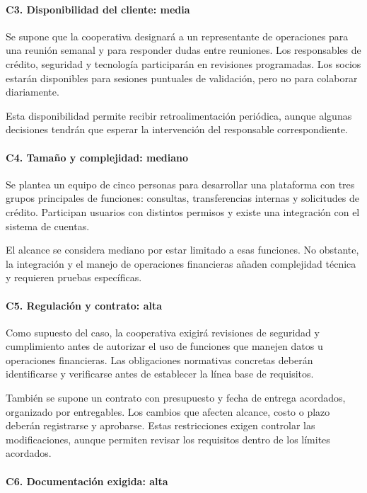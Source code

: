 \paragraph{C3. Disponibilidad del cliente: media}

Se supone que la cooperativa designará a un representante de operaciones para una reunión semanal y para responder dudas entre reuniones. Los responsables de crédito, seguridad y tecnología participarán en revisiones programadas. Los socios estarán disponibles para sesiones puntuales de validación, pero no para colaborar diariamente.

Esta disponibilidad permite recibir retroalimentación periódica, aunque algunas decisiones tendrán que esperar la intervención del responsable correspondiente.

\paragraph{C4. Tamaño y complejidad: mediano}

Se plantea un equipo de cinco personas para desarrollar una plataforma con tres grupos principales de funciones: consultas, transferencias internas y solicitudes de crédito. Participan usuarios con distintos permisos y existe una integración con el sistema de cuentas.

El alcance se considera mediano por estar limitado a esas funciones. No obstante, la integración y el manejo de operaciones financieras añaden complejidad técnica y requieren pruebas específicas.

\paragraph{C5. Regulación y contrato: alta}

Como supuesto del caso, la cooperativa exigirá revisiones de seguridad y cumplimiento antes de autorizar el uso de funciones que manejen datos u operaciones financieras. Las obligaciones normativas concretas deberán identificarse y verificarse antes de establecer la línea base de requisitos.

También se supone un contrato con presupuesto y fecha de entrega acordados, organizado por entregables. Los cambios que afecten alcance, costo o plazo deberán registrarse y aprobarse. Estas restricciones exigen controlar las modificaciones, aunque permiten revisar los requisitos dentro de los límites acordados.

\paragraph{C6. Documentación exigida: alta}

